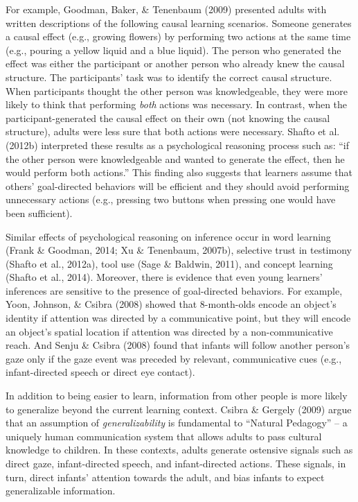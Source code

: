 \documentclass[oneside]{report}
\begin{document}
For example, Goodman, Baker, \& Tenenbaum (2009) presented adults with
written descriptions of the following causal learning scenarios. Someone
generates a causal effect (e.g., growing flowers) by performing two
actions at the same time (e.g., pouring a yellow liquid and a blue
liquid). The person who generated the effect was either the participant
or another person who already knew the causal structure. The
participants' task was to identify the correct causal structure. When
participants thought the other person was knowledgeable, they were more
likely to think that performing \emph{both} actions was necessary. In
contrast, when the participant-generated the causal effect on their own
(not knowing the causal structure), adults were less sure that both
actions were necessary. Shafto et al. (2012b) interpreted these results
as a psychological reasoning process such as: ``if the other person were
knowledgeable and wanted to generate the effect, then he would perform
both actions.'' This finding also suggests that learners assume that
others' goal-directed behaviors will be efficient and they should avoid
performing unnecessary actions (e.g., pressing two buttons when pressing
one would have been sufficient).

Similar effects of psychological reasoning on inference occur in word
learning (Frank \& Goodman, 2014; Xu \& Tenenbaum, 2007b), selective
trust in testimony (Shafto et al., 2012a), tool use (Sage \& Baldwin,
2011), and concept learning (Shafto et al., 2014). Moreover, there is
evidence that even young learners' inferences are sensitive to the
presence of goal-directed behaviors. For example, Yoon, Johnson, \&
Csibra (2008) showed that 8-month-olds encode an object's identity if
attention was directed by a communicative point, but they will encode an
object's spatial location if attention was directed by a
non-communicative reach. And Senju \& Csibra (2008) found that infants
will follow another person's gaze only if the gaze event was preceded by
relevant, communicative cues (e.g., infant-directed speech or direct eye
contact).

In addition to being easier to learn, information from other people is
more likely to generalize beyond the current learning context. Csibra \&
Gergely (2009) argue that an assumption of \emph{generalizability} is
fundamental to ``Natural Pedagogy'' -- a uniquely human communication
system that allows adults to pass cultural knowledge to children. In
these contexts, adults generate ostensive signals such as direct gaze,
infant-directed speech, and infant-directed actions. These signals, in
turn, direct infants' attention towards the adult, and bias infants to
expect generalizable information.
\end{document}
